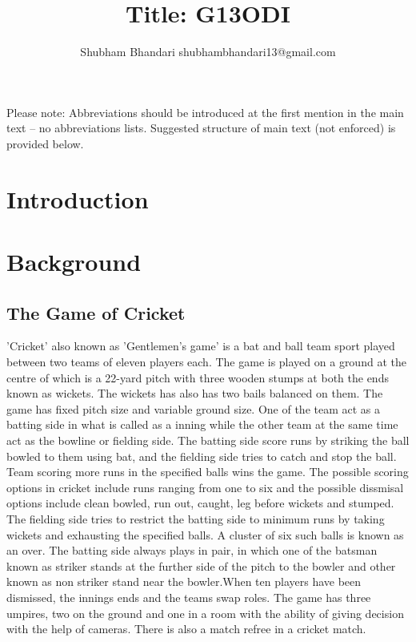\documentclass[fleqn,10pt]{wlscirep}
\title{Title: G13ODI}
\author{Shubham Bhandari shubhambhandari13@gmail.com}
\affil[]{This is project report for the subject 'CS1305: Business Intelligence' at JK Lakshmipat University, Jaipur}
\begin{document}
\flushbottom
\maketitle
\thispagestyle{empty}

\noindent Please note: Abbreviations should be introduced at the first mention in the main text – no abbreviations lists. Suggested structure of main text (not enforced) is provided below.

\section{Introduction}

\section{Background}
\subsection{The Game of Cricket}
'Cricket' also known as 'Gentlemen's game' is a bat and ball team sport played between two teams of eleven players each. 
The game is played on a ground at the centre of which is a 22-yard pitch with three wooden stumps at both the ends known as wickets.
The wickets has also has two bails balanced on them. The game has fixed pitch size and variable ground size. 
One of the team act as a batting side in what is called as a inning while the other team at the same time act as the bowline or fielding side.
The batting side score runs by striking the ball bowled to them using bat, and the fielding side tries to catch and stop the ball. 
Team scoring more runs in the specified balls wins the game.
The possible scoring options in cricket include runs ranging from one to six and the possible dissmisal options include clean bowled, run out, caught, leg before wickets
and stumped.
The fielding side tries to restrict the batting side to minimum runs by taking wickets and exhausting the specified balls. 
A cluster of six such balls is known as an over.
The batting side always plays in pair, in which one of the batsman known as striker stands at the further side of the pitch to the bowler and other known as non striker
stand near the bowler.When ten players have been dismissed, the innings ends and the teams swap roles. The game has three umpires, two on the ground and one in a room
with the ability of giving decision with the help of cameras. There is also a match refree in a cricket match.
\end{document}
